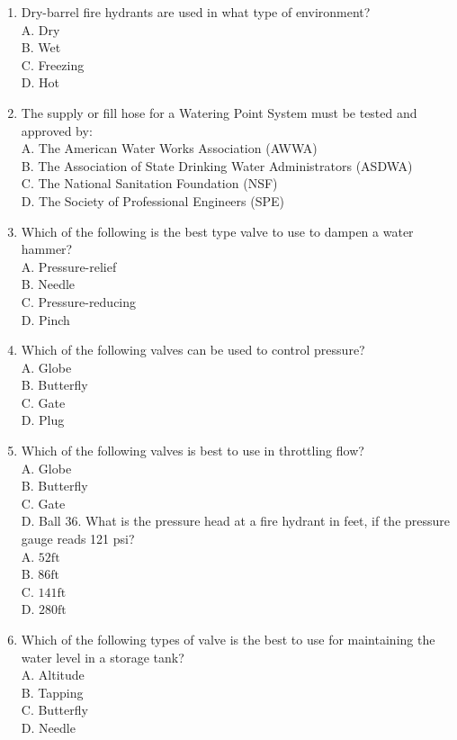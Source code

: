 \documentclass[10pt]{article}
\begin{document}
\begin{enumerate}
  \item Dry-barrel fire hydrants are used in what type of environment?\\
A. Dry\\
B. Wet\\
C. Freezing\\
D. Hot

  \item The supply or fill hose for a Watering Point System must be tested and approved by:\\
A. The American Water Works Association (AWWA)\\
B. The Association of State Drinking Water Administrators (ASDWA)\\
C. The National Sanitation Foundation (NSF)\\
D. The Society of Professional Engineers (SPE)

  \item Which of the following is the best type valve to use to dampen a water hammer?\\
A. Pressure-relief\\
B. Needle\\
C. Pressure-reducing\\
D. Pinch

  \item Which of the following valves can be used to control pressure?\\
A. Globe\\
B. Butterfly\\
C. Gate\\
D. Plug

  \item Which of the following valves is best to use in throttling flow?\\
A. Globe\\
B. Butterfly\\
C. Gate\\
D. Ball 36. What is the pressure head at a fire hydrant in feet, if the pressure gauge reads 121 psi?\\
A. $52 \mathrm{ft}$\\
B. $86 \mathrm{ft}$\\
C. $141 \mathrm{ft}$\\
D. $280 \mathrm{ft}$

  \item Which of the following types of valve is the best to use for maintaining the water level in a storage tank?\\
A. Altitude\\
B. Tapping\\
C. Butterfly\\
D. Needle


\end{enumerate}
\end{document}
